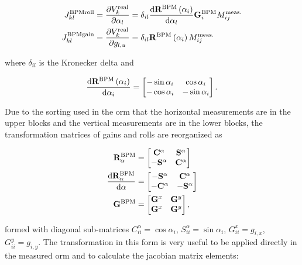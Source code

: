\begin{align}
    J_{kl}^{\mathrm{BPMroll}} = \dfrac{\partial {V}_k^{\mathrm{real}}}{\partial \alpha_l} &= \delta_{il}\dfrac{\mathrm{d} \mathbf{R}^\mathrm{BPM}\left(\alpha_i\right)}{\mathrm{d} \alpha_l} \mathbf{G}_{i}^{\mathrm{BPM}} {M}^{\mathrm{meas.}}_{ij} \\
    J_{kl}^{\mathrm{BPMgain}} = \dfrac{\partial {V}_k^{\mathrm{real}}}{\partial g_{l, u}} &= \delta_{il}\mathbf{R}^\mathrm{BPM}\left(\alpha_i\right){M}^{\mathrm{meas.}}_{ij}
\end{align}

where $\delta_{il}$ is the Kronecker delta and 

\begin{equation*}
    \dfrac{\mathrm{d} \mathbf{R}^\mathrm{BPM}\left(\alpha_i\right)}{\mathrm{d} \alpha_i} =
    \begin{bmatrix}
    -\sin\alpha_i & \cos\alpha_i \\
     -\cos\alpha_i & -\sin\alpha_i 
    \end{bmatrix}.
\end{equation*}

Due to the sorting used in the \gls{orm} that the horizontal measurements are in the upper blocks and the vertical measurements are in the lower blocks, the transformation matrices of gains and rolls are reorganized as

\begin{align*}
    \mathbf{R}^\mathrm{BPM}_{\alpha} &=
    \begin{bmatrix}
    \mathbf{C}^\alpha &  \mathbf{S}^\alpha \\
     -\mathbf{S}^\alpha & \mathbf{C}^\alpha
    \end{bmatrix} \\
    \dfrac{\mathrm{d} \mathbf{R}^\mathrm{BPM}_{\alpha}}{\mathrm{d} \alpha} &=
    \begin{bmatrix}
    -\mathbf{S}^\alpha &  \mathbf{C}^\alpha \\
    -\mathbf{C}^\alpha & -\mathbf{S}^\alpha
    \end{bmatrix} \\
    \mathbf{G}^{\mathrm{BPM}} &=
    \begin{bmatrix}
    \mathbf{G}^x & \mathbf{G}^y \\
    \mathbf{G}^x & \mathbf{G}^y
    \end{bmatrix},
\end{align*}

formed with diagonal sub-matrices ${C}^{\alpha}_{ii} = \cos\alpha_i$, ${S}^{\alpha}_{ii} = \sin\alpha_i$, ${G}^{x}_{ii} = g_{i, x}$, ${G}^{y}_{ii} = g_{i, y}$. The transformation in this form is very useful to be applied directly in the measured \gls{orm} and to calculate the jacobian matrix elements:

